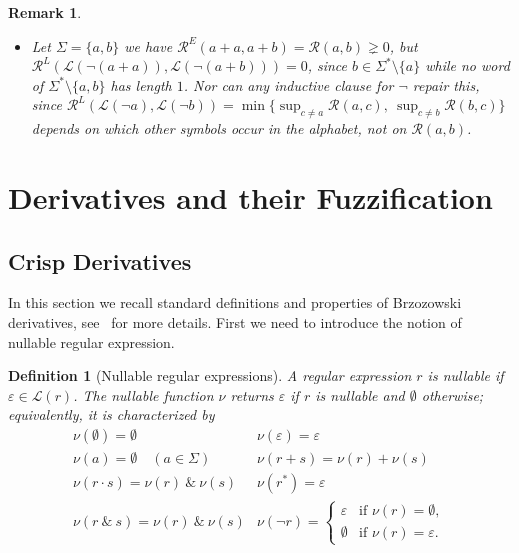 \documentclass{article}
\newtheorem{definition}{Definition}[section]
\newtheorem{remark}{Remark}[section]
\begin{document}
\begin{remark}
\begin{itemize}
\item[($\neg$)] Let $\Sigma=\{a,b\}$ we have
$\mathcal R^E(a+a,a+b)=\mathcal R(a,b)\gneq 0$, but
$\mathcal R^L(\mathcal L(\neg(a+a)),\mathcal L(\neg(a+b)))=0$, since $b\in\Sigma^*\setminus\{a\}$
while no word of $\Sigma^*\setminus\{a,b\}$ has length $1$. Nor can any inductive clause
for $\neg$ repair this, since
$\mathcal R^L(\mathcal L(\neg a),\mathcal L(\neg b))=
\min\{\sup_{c\neq a}\mathcal R(a,c),\ \sup_{c\neq b}\mathcal R(b,c)\}$
depends on which other symbols occur in the alphabet, not on $\mathcal R(a,b)$.
\end{itemize}
\end{remark}



\section{Derivatives and their Fuzzification}


\subsection{Crisp Derivatives}\label{crisp-derivative}
In this section we recall standard definitions and properties of Brzozowski derivatives, see~\cite{B64,Thiemann2016} for more details. First we need to introduce the notion of nullable regular expression. 
\begin{definition}[Nullable regular expressions]\label{def:nullable}
A regular expression $r$ is \emph{nullable} if $\varepsilon \in \mathcal{L}(r)$. The
\emph{nullable} function $\nu$ returns $\varepsilon$ if $r$ is nullable and $\emptyset$
otherwise; equivalently, it is characterized by
\[
\begin{array}{ll}
     \nu(\emptyset)=\emptyset &
     \nu(\varepsilon)=\varepsilon \\[1ex]
     \nu(a)=\emptyset \quad (a \in \Sigma)&
     \nu(r+s) = \nu(r) + \nu(s) \\[1ex]
     \nu(r\cdot s)=\nu(r)\: \& \: \nu(s) &
     \nu(r^*) = \varepsilon \\[1ex]
     \nu(r\:\&\:s) = \nu(r) \: \& \: \nu(s) &
     \nu(\neg r)=
     \begin{cases}
         \varepsilon & \text{if } \nu(r) = \emptyset, \\
         \emptyset & \text{if } \nu(r) = \varepsilon.
     \end{cases}
\end{array}
\]
\end{definition}
\end{document}
